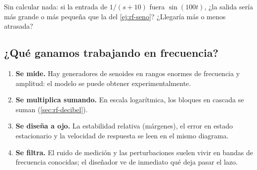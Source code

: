 \begin{pausa}
Sin calcular nada: si la entrada de $1/(s+10)$ fuera $\sin(100t)$, ¿la salida sería más grande o más pequeña que la del \cref{ej:rf-seno}? ¿Llegaría más o menos atrasada?
\end{pausa}

\subsection{¿Qué ganamos trabajando en frecuencia?}
\begin{enumerate}
  \item \textbf{Se mide.} Hay generadores de senoides en rangos enormes de frecuencia y amplitud: el modelo se puede obtener experimentalmente.
  \item \textbf{Se multiplica sumando.} En escala logarítmica, los bloques en cascada se suman (\cref{sec:rf-decibel}).
  \item \textbf{Se diseña a ojo.} La estabilidad relativa (márgenes), el error en estado estacionario y la velocidad de respuesta se leen en el mismo diagrama.
  \item \textbf{Se filtra.} El ruido de medición y las perturbaciones suelen vivir en bandas de frecuencia conocidas; el diseñador ve de inmediato qué deja pasar el lazo.
\end{enumerate}
